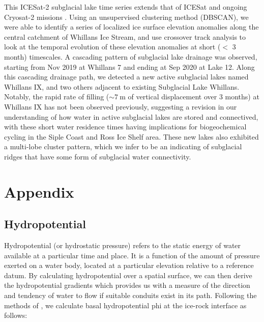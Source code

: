 This ICESat-2 subglacial lake time series extends that of ICESat and ongoing Cryosat-2 missions \citep{SiegfriedThirteenyearssubglacial2018}.
Using an unsupervised clustering method (DBSCAN), we were able to identify a series of localized ice surface elevation anomalies along the central catchment of Whillans Ice Stream, and use crossover track analysis to look at the temporal evolution of these elevation anomalies at short ($<$ 3 month) timescales.
A cascading pattern of subglacial lake drainage was observed, starting from Nov 2019 at Whillans 7 and ending at Sep 2020 at Lake 12.
Along this cascading drainage path, we detected a new active subglacial lakes named Whillans IX, and two others adjacent to existing Subglacial Lake Whillans.
Notably, the rapid rate of filling ($\sim\SI{7}{\metre}$ of vertical displacement over 3 months) at Whillans IX has not been observed previously, suggesting a revision in our understanding of how water in active subglacial lakes are stored and connectived, with these short water residence times having implications for biogeochemical cycling in the Siple Coast and Ross Ice Shelf area.
These new lakes also exhibited a multi-lobe cluster pattern, which we infer to be an indicating of subglacial ridges that have some form of subglacial water connectivity.

\section{Appendix}

\subsection{Hydropotential} \label{sec:hydropotential}


Hydropotential (or hydrostatic pressure) refers to the static energy of water available at a particular time and place.
It is a function of the amount of pressure exerted on a water body, located at a particular elevation relative to a reference datum.
By calculating hydropotential over a spatial surface, we can then derive the hydropotential gradients which provides us with a measure of the direction and tendency of water to flow if suitable conduits exist in its path.
Following the methods of \citet{ShreveMovementWaterGlaciers1972}, we calculate basal hydropotential \gls{phi} at the ice-rock interface as follows:

